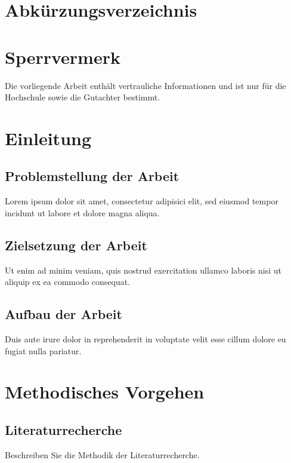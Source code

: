 \documentclass[12pt, a4paper, oneside]{article}
\begin{document}
	\section*{Abkürzungsverzeichnis}
	\begin{acronym}
	\end{acronym}
	\newpage
	
	\section*{Sperrvermerk}
	Die vorliegende Arbeit enthält vertrauliche Informationen und ist nur für die Hochschule sowie die Gutachter bestimmt.
	\newpage
	
	\section{Einleitung}
	\subsection{Problemstellung der Arbeit}
	Lorem ipsum dolor sit amet, consectetur adipisici elit, sed eiusmod tempor incidunt ut labore et dolore magna aliqua.
	
	\subsection{Zielsetzung der Arbeit}
	Ut enim ad minim veniam, quis nostrud exercitation ullamco laboris nisi ut aliquip ex ea commodo consequat.
	
	\subsection{Aufbau der Arbeit}
	Duis aute irure dolor in reprehenderit in voluptate velit esse cillum dolore eu fugiat nulla pariatur.
	
	\section{Methodisches Vorgehen}
	\subsection{Literaturrecherche}
	Beschreiben Sie die Methodik der Literaturrecherche.
	
\end{document}

